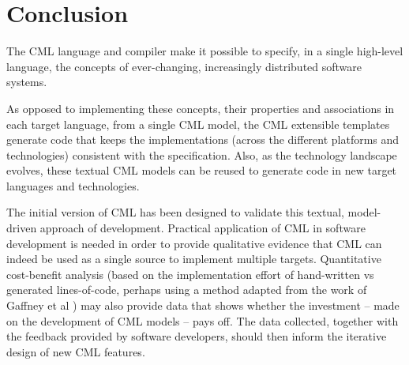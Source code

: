 \section{Conclusion}\label{sec:conclusion}

The CML language and compiler make it possible to specify,
in a single high-level language,
the concepts of ever-changing, increasingly distributed software systems.

As opposed to implementing these concepts, their properties and associations in each target language,
from a single CML model,
the CML extensible templates generate code that
keeps the implementations 
(across the different platforms and technologies) 
consistent with the specification.
Also, as the technology landscape evolves,
these textual CML models can be reused to generate code in new target languages and technologies.

The initial version of CML has been designed to validate this textual, model-driven approach of development.
Practical application of CML in software development is needed in order to provide qualitative evidence that
CML can indeed be used as a single source to implement multiple targets.
Quantitative cost-benefit analysis
(based on the implementation effort of hand-written vs generated lines-of-code, perhaps using a method adapted from the work of Gaffney et al \cite{gaffney})
may also provide data
that shows whether the investment -- made on the development of CML models -- pays off. The data collected, together with the feedback provided by software developers, should then inform the iterative design of new CML features.
